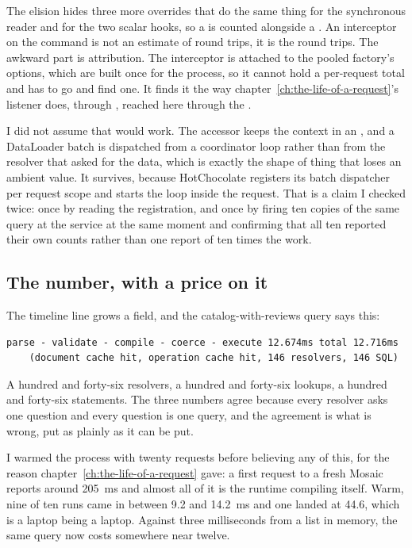 The elision hides three more overrides that do the same thing for the
synchronous reader and for the two scalar hooks, so a  is
counted alongside a . An interceptor on the command is not an
estimate of round trips, it is the round trips. The awkward part is
attribution. The interceptor is attached to the
pooled factory's options, which are built once for the process, so it cannot
hold a per-request total and has to go and find one. It finds it the way
chapter~\ref{ch:the-life-of-a-request}'s listener does, through
, reached here through the .

I did not assume that would work. The accessor keeps the context in an
, and a DataLoader batch is dispatched from a coordinator loop
rather than from the resolver that asked for the data, which is exactly the
shape of thing that loses an ambient value. It survives, because HotChocolate
registers its batch dispatcher per request scope and starts the loop inside the
request. That is a claim I checked twice: once by reading the registration, and
once by firing ten copies of the same query at the service at the same moment
and confirming that all ten reported their own counts rather than one report of
ten times the work.

\subsection*{The number, with a price on it}

%
The timeline line grows a field, and the catalog-with-reviews query says this:

\begin{verbatim}
parse - validate - compile - coerce - execute 12.674ms total 12.716ms
    (document cache hit, operation cache hit, 146 resolvers, 146 SQL)
\end{verbatim}

A hundred and forty-six resolvers, a hundred and forty-six lookups, a hundred
and forty-six statements. The three numbers agree because every resolver asks
one question and every question is one query, and the agreement is what is
wrong, put as plainly as it can be put.

I warmed the process with twenty requests before believing any of this, for the
reason chapter~\ref{ch:the-life-of-a-request} gave: a first request to a fresh
Mosaic reports around 205~ms and almost all of it is the runtime compiling
itself. Warm, nine of ten runs came in between 9.2 and 14.2~ms and one landed at
44.6, which is a laptop being a laptop. Against three milliseconds from a list in
memory, the same query now costs somewhere near twelve.


